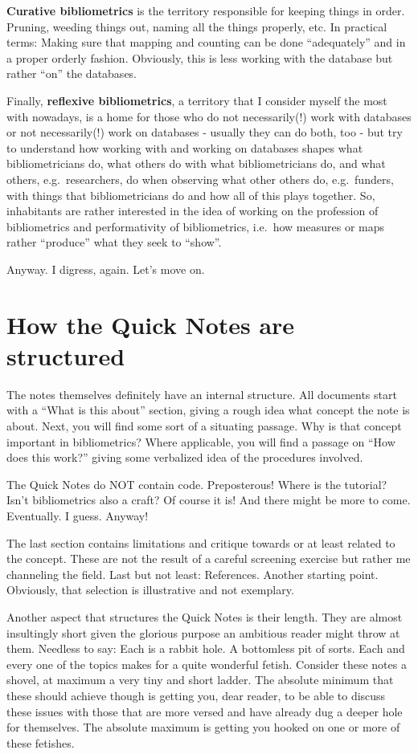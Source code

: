 \documentclass[
  letterpaper,
]{scrreprt}
\begin{document}
\textbf{Curative bibliometrics} is the territory responsible for keeping
things in order. Pruning, weeding things out, naming all the things
properly, etc. In practical terms: Making sure that mapping and counting
can be done ``adequately'' and in a proper orderly fashion. Obviously,
this is less working with the database but rather ``on'' the databases.

Finally, \textbf{reflexive bibliometrics}, a territory that I consider
myself the most with nowadays, is a home for those who do not
necessarily(!) work with databases or not necessarily(!) work on
databases - usually they can do both, too - but try to understand how
working with and working on databases shapes what bibliometricians do,
what others do with what bibliometricians do, and what others,
e.g.~researchers, do when observing what other others do, e.g.~funders,
with things that bibliometricians do and how all of this plays together.
So, inhabitants are rather interested in the idea of working on the
profession of bibliometrics and performativity of bibliometrics,
i.e.~how measures or maps rather ``produce'' what they seek to ``show''.

Anyway. I digress, again. Let's move on.

\section{How the Quick Notes are
structured}\label{how-the-quick-notes-are-structured}

The notes themselves definitely have an internal structure. All
documents start with a ``What is this about'' section, giving a rough
idea what concept the note is about. Next, you will find some sort of a
situating passage. Why is that concept important in bibliometrics? Where
applicable, you will find a passage on ``How does this work?'' giving
some verbalized idea of the procedures involved.

The Quick Notes do NOT contain code. Preposterous! Where is the
tutorial? Isn't bibliometrics also a craft? Of course it is! And there
might be more to come. Eventually. I guess. Anyway!

The last section contains limitations and critique towards or at least
related to the concept. These are not the result of a careful screening
exercise but rather me channeling the field. Last but not least:
References. Another starting point. Obviously, that selection is
illustrative and not exemplary.

Another aspect that structures the Quick Notes is their length. They are
almost insultingly short given the glorious purpose an ambitious reader
might throw at them. Needless to say: Each is a rabbit hole. A
bottomless pit of sorts. Each and every one of the topics makes for a
quite wonderful fetish. Consider these notes a shovel, at maximum a very
tiny and short ladder. The absolute minimum that these should achieve
though is getting you, dear reader, to be able to discuss these issues
with those that are more versed and have already dug a deeper hole for
themselves. The absolute maximum is getting you hooked on one or more of
these fetishes.
\end{document}
